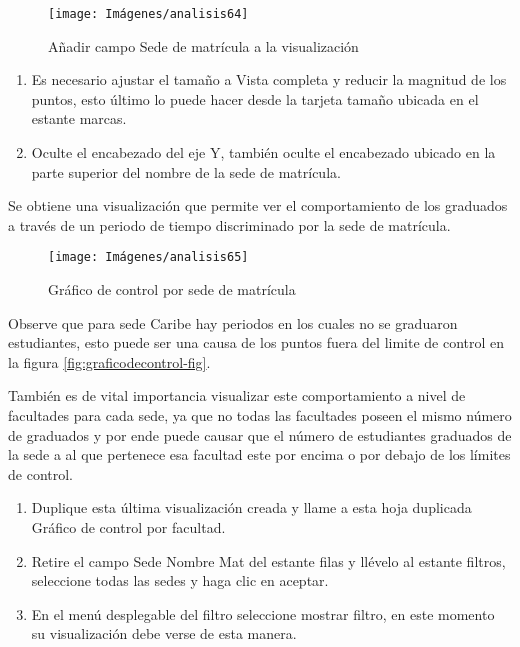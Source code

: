 \documentclass[
]{book}
\begin{document}
\begin{figure}

{\centering \texttt{[image: Imágenes/analisis64]} 

}

\caption{Añadir campo Sede de matrícula a la visualización}\label{fig:paso3controlsede-fig}
\end{figure}

\begin{enumerate}
\def\labelenumi{\arabic{enumi}.}
\setcounter{enumi}{3}
\item
  Es necesario ajustar el tamaño a Vista completa y reducir la magnitud de los puntos, esto último lo puede hacer desde la tarjeta tamaño ubicada en el estante marcas.
\item
  Oculte el encabezado del eje Y, también oculte el encabezado ubicado en la parte superior del nombre de la sede de matrícula.
\end{enumerate}

Se obtiene una visualización que permite ver el comportamiento de los graduados a través de un periodo de tiempo discriminado por la sede de matrícula.

\begin{figure}

{\centering \texttt{[image: Imágenes/analisis65]} 

}

\caption{Gráfico de control por sede de matrícula}\label{fig:controlsede-fig}
\end{figure}

Observe que para sede Caribe hay periodos en los cuales no se graduaron estudiantes, esto puede ser una causa de los puntos fuera del limite de control en la figura \ref{fig:graficodecontrol-fig}.

También es de vital importancia visualizar este comportamiento a nivel de facultades para cada sede, ya que no todas las facultades poseen el mismo número de graduados y por ende puede causar que el número de estudiantes graduados de la sede a al que pertenece esa facultad este por encima o por debajo de los límites de control.

\begin{enumerate}
\def\labelenumi{\arabic{enumi}.}
\item
  Duplique esta última visualización creada y llame a esta hoja duplicada Gráfico de control por facultad.
\item
  Retire el campo Sede Nombre Mat del estante filas y llévelo al estante filtros, seleccione todas las sedes y haga clic en aceptar.
\item
  En el menú desplegable del filtro seleccione mostrar filtro, en este momento su visualización debe verse de esta manera.
\end{enumerate}
\end{document}
